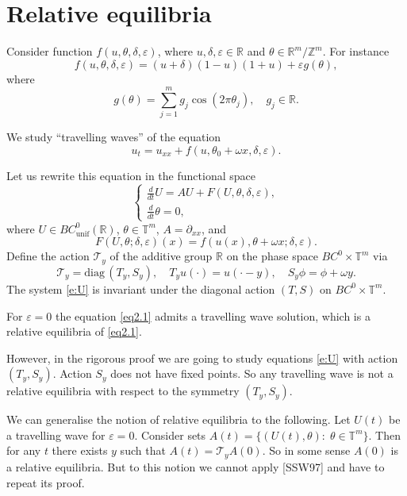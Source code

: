 \documentclass[letterpaper,11pt]{article}
\newcommand{\R}{\mathbb{R}}
\newcommand{\Z}{\mathbb{Z}}
\newcommand{\T}{\mathbb{T}}
\numberwithin{equation}{section}
\theoremstyle{plain}
\begin{document}
\section{Relative equilibria}

Consider function $f(u, \theta, \delta, \varepsilon)$,
where $u, \delta, \varepsilon \in \R$ and $\theta \in \R^m/\Z^m$. For instance
$$
f(u, \theta, \delta, \varepsilon) = (u+ \delta)(1-u)(1+u) + \varepsilon g(\theta),
$$
where
$$
g(\theta) = \sum_{j = 1}^{m}g_j\cos(2 \pi \theta_j), \quad g_j \in \R.
$$

We study ``travelling waves'' of the equation
\begin{equation}\label{eq2.1}
  u_t = u_{xx} + f(u, \theta_0 + \omega x, \delta, \varepsilon).
\end{equation}

Let us rewrite this equation in the functional space
\begin{equation}\label{e:U}
\begin{cases}
\frac{d}{dt}U = A U + F(U, \theta, \delta, \varepsilon),\\
\frac{d}{dt}\theta = 0,
\end{cases}
\end{equation}
where $U\in BC^0_\mathrm{unif}(\R)$, $\theta\in\T^m$, $A=\partial_{xx}$, and
$$
F(U,\theta;\delta,\varepsilon)(x)=f(u(x),\theta + \omega x;\delta,\varepsilon).
$$
Define the action $\mathcal{T}_y$ of the additive group $\R$ on the phase space $BC^0\times \T^m$ via
\[
\mathcal{T}_y=\mathrm{diag}\,(T_y,S_y), \quad T_y u(\cdot)=u(\cdot -y),\quad  S_y \phi = \phi+\omega y.
\]
The system \eqref{e:U} is invariant under the diagonal action $(T,S)$ on $BC^0\times \T^m$.

For $\varepsilon = 0$ the equation \eqref{eq2.1} admits a travelling wave solution, which is a relative equilibria of \eqref{eq2.1}.

However, in the rigorous proof we are going to study equations \eqref{e:U} with action $(T_y, S_y)$. Action $S_y$ does not have fixed points. So any travelling wave is not a relative equilibria with respect to the symmetry $(T_y, S_y)$. 

We can generalise the notion of relative equilibria to the following. Let $U(t)$ be a travelling wave for $\varepsilon = 0$. Consider sets $A(t) = \{(U(t), \theta): \; \theta \in \T^m\}$. Then for any $t$ there exists $y$ such that $A(t) = \mathcal{T}_y A(0)$. So in some sense $A(0)$ is a relative equilibria. But to this notion we cannot apply [SSW97] and have to repeat its proof.
\end{document}
